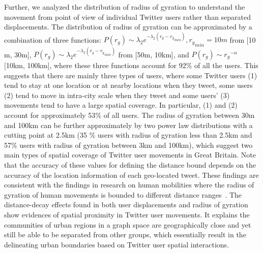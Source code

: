 \documentclass[10pt,letterpaper]{article}
\begin{document}
Further, we analyzed the distribution of radius of gyration to understand the movement from point of view of individual Twitter users rather than separated displacements.
The distribution of radius of gyration can be approximated by a combination of three functions: $P(r_{g}) \sim \lambda_{2} e^{-\lambda_{2}(r_{g} - {r_{g}}_{min})}, {r_{g}}_{min}=10m$ from [10 m, 30m], $P(r_{g}) \sim \lambda_{2} e^{-\lambda_{2}(r_{g} - {r_{g}}_{min})}$ from [50m, 10km], and $P(r_{g}) \sim {r_{g}}^{-\alpha}$ [10km, 100km], where these three functions account for 92$\%$ of all the users.
This suggests that there are mainly three types of users, where some Twitter users (1) tend to stay at one location or at nearby locations when they tweet, some users (2) tend to move in intra-city scale when they tweet and some users’ (3) movements tend to have a large spatial coverage. 
In particular, (1) and (2) account for approximately 53$\%$ of all users.  
The radius of gyration between 30m and 100km can be further approximately by two power law distributions with a cutting point at 2.5km (35 $\%$ users with radius of gyration less than 2.5km and 57$\%$ users with radius of gyration between 3km and 100km), which suggest two main types of spatial coverage of Twitter user movements in Great Britain. 
Note that the accuracy of these values for defining the distance bound depends on the accuracy of the location information of each geo-located tweet. 
These findings are consistent with the findings in research on human mobilities where the radius of gyration of human movements is bounded to different distance ranges~\cite{brockmann2006,gonzalez2008}.
The distance-decay effects found in both user displacements and radius of gyration show evidences of spatial proximity in Twitter user movements. 
It explains the communities of urban regions in a graph space are geographically close and yet still be able to be separated from other groups, which essentially result in the delineating urban boundaries based on Twitter user spatial interactions.
\end{document}
